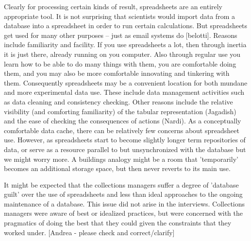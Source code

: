 Clearly for processing certain kinds of result, spreadsheets are an entirely appropriate tool. It is not surprising that scientists would import data from a database into a spreadsheet in order to run certain calculations. But spreadsheets get used for many other purposes – just as email systems do [belotti]. Reasons include familiarity and facility. If you use spreadsheets a lot, then through inertia it is just there, already running on you computer. Also through regular use you learn how to be able to do many things with them, you are comfortable doing them, and you may also be more comfortable innovating and tinkering with them.  Consequently spreadsheets may be a convenient location for both mundane and more experimental data use. These include data management activities such as data cleaning and consistency checking.  Other reasons include the relative visibility (and comforting familiarity) of the tabular representation (Jagadish) and the ease of checking the consequences of actions (Nardi). As a conceptually comfortable data cache, there can be relatively few concerns about spreadsheet use. However, as spreadsheets start to become slightly longer term repositories of data, or serve as a resource parallel to but unsynchronized with the database but  we might worry more. A buildings analogy might be a room that 'temporarily' becomes an additional storage space, but then never reverts to its main use.

It might be expected that the collections managers suffer a degree of 'database guilt' over the use of spreadsheets and less than ideal approaches to the ongoing maintenance of a database. This issue did not arise in the interviews. Collections managers were aware of best or idealized practices, but were concerned with the pragmatics of doing the best that they could given the constraints that they worked under. [Andrea - please check and correct/clarify]

